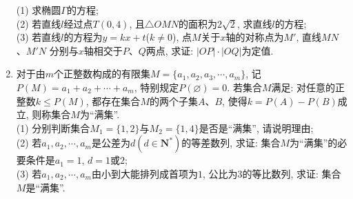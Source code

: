 \documentclass[10pt,a4paper]{article}
\begin{document}
\begin{enumerate}[1.]
\begin{center}
\end{center}
(1) 求椭圆$\Gamma$的方程;\\
(2) 若直线$l$经过点$T(0,4)$, 且$\triangle OMN$的面积为$2\sqrt 2$, 求直线$l$的方程;\\
(3) 若直线$l$的方程为$y=kx+t$($k\ne 0$), 点$M$关于$x$轴的对称点为$M'$, 直线$MN$、$M'N$ 分别与$x$轴相交于$P$、$Q$两点, 求证: $|OP|\cdot|OQ|$为定值.
\item 对于由$m$个正整数构成的有限集$M=\{a_1,a_2,a_3,\cdots ,a_m\}$, 记$P(M)=a_1+a_2+\cdots +a_m$, 特别规定$P(\varnothing)=0$. 若集合$M$满足: 对任意的正整数$k\le P(M)$, 都存在集合$M$的两个子集$A$、$B$, 使得$k=P(A)-P(B)$成立, 则称集合$M$为``满集''.\\
(1) 分别判断集合$M_1=\{1,2\}$与$M_2=\{1,4\}$是否是``满集'', 请说明理由;\\
(2) 若$a_1,a_2,\cdots ,a_m$是公差为$d(d\in \mathbf{N}^*)$的等差数列, 求证: 集合$M$为``满集''的必要条件是$a_1=1$, $d=1$或$2$;\\
(3) 若$a_1,a_2,\cdots ,a_m$由小到大能排列成首项为$1$, 公比为$3$的等比数列, 求证: 集合$M$是``满集''.


\end{enumerate}
\end{document}
